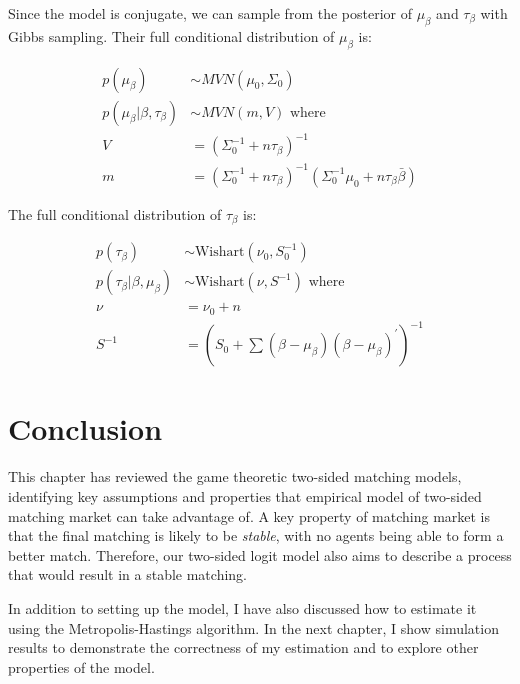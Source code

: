 Since the model is conjugate, we can sample from the posterior of $\mu_{\beta}$
and $\tau_{\beta}$ with Gibbs sampling. Their full conditional distribution of
$\mu_{\beta}$ is:

\begin{align}
  p(\mu_{\beta}) &\sim MVN(\mu_0, \Sigma_0) \\
  p(\mu_{\beta} | \beta, \tau_{\beta}) &\sim MVN(m, V) \text{ where } \\
  V &= (\Sigma_0^{-1} + n \tau_{\beta})^{-1} \\
  m &= (\Sigma_0^{-1} + n \tau_{\beta})^{-1} (\Sigma_0^{-1}\mu_0 + n \tau_{\beta} \bar \beta)
\end{align}

The full conditional distribution of $\tau_{\beta}$ is:

\begin{align}
  p(\tau_{\beta}) &\sim \text{Wishart}(\nu_0, S_0^{-1}) \\
  p(\tau_{\beta} | \beta, \mu_{\beta}) &\sim \text{Wishart}(\nu, S^{-1}) \text{ where } \\
  \nu &= \nu_0 + n \\
  S^{-1} &= \left(S_0 + \sum (\beta - \mu_{\beta})(\beta - \mu_{\beta})^{\prime}\right)^{-1}
\end{align}

\section{Conclusion}

This chapter has reviewed the game theoretic two-sided matching models,
identifying key assumptions and properties that empirical model of two-sided
matching market can take advantage of. A key property of matching market is that
the final matching is likely to be \textit{stable}, with no agents being able to
form a better match. Therefore, our two-sided logit model also aims to describe a
process that would result in a stable matching.

In addition to setting up the model, I have also discussed how to estimate it
using the Metropolis-Hastings algorithm. In the next chapter, I show simulation
results to demonstrate the correctness of my estimation and to explore other
properties of the model.

